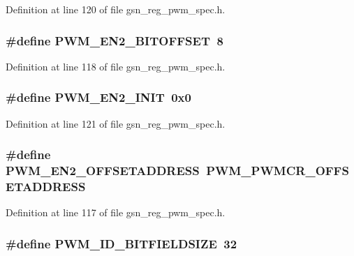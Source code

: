 Definition at line 120 of file gsn\_\-reg\_\-pwm\_\-spec.h.

\hypertarget{a00565_af559c0fb6de2e23f4d380dda6d592c55}{
\subsubsection[{PWM\_\-EN2\_\-BITOFFSET}]{\setlength{\rightskip}{0pt plus 5cm}\#define PWM\_\-EN2\_\-BITOFFSET~8}}
\label{a00565_af559c0fb6de2e23f4d380dda6d592c55}


Definition at line 118 of file gsn\_\-reg\_\-pwm\_\-spec.h.

\hypertarget{a00565_a2e1c438f84f028e37fcddb3aa9a28c73}{
\subsubsection[{PWM\_\-EN2\_\-INIT}]{\setlength{\rightskip}{0pt plus 5cm}\#define PWM\_\-EN2\_\-INIT~0x0}}
\label{a00565_a2e1c438f84f028e37fcddb3aa9a28c73}


Definition at line 121 of file gsn\_\-reg\_\-pwm\_\-spec.h.

\hypertarget{a00565_a82c2a6a73b8bea0771bf6add0d32f143}{
\subsubsection[{PWM\_\-EN2\_\-OFFSETADDRESS}]{\setlength{\rightskip}{0pt plus 5cm}\#define PWM\_\-EN2\_\-OFFSETADDRESS~PWM\_\-PWMCR\_\-OFFSETADDRESS}}
\label{a00565_a82c2a6a73b8bea0771bf6add0d32f143}


Definition at line 117 of file gsn\_\-reg\_\-pwm\_\-spec.h.

\hypertarget{a00565_a2eb8bd2ff17c539025823cbe71616f89}{
\subsubsection[{PWM\_\-ID\_\-BITFIELDSIZE}]{\setlength{\rightskip}{0pt plus 5cm}\#define PWM\_\-ID\_\-BITFIELDSIZE~32}}
\label{a00565_a2eb8bd2ff17c539025823cbe71616f89}


